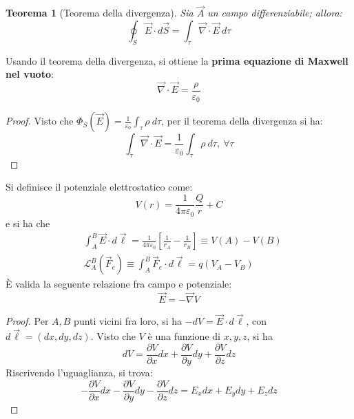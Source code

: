 \documentclass[10pt, a4paper]{scrartcl}
\numberwithin{equation}{subsection}
\theoremstyle{style1}
\newtheorem{teorema}{Teorema}[section]
\newenvironment{boxenv}[1][]{
    \begin{eqbox}[#1]
    }{
   \end{eqbox}
}
\begin{document}
\begin{teorema}
	[Teorema della divergenza]
	Sia $\vec{A}$ un campo differenziabile; allora:
	\begin{equation}
		\oint_{S} \vec{E}\cdot d\vec{S}= \int_{\tau } \vec{\nabla }\cdot \vec{E}\ d\tau 
	\end{equation}
\end{teorema}
\noindent Usando il teorema della divergenza, si ottiene la \textbf{prima equazione di Maxwell nel vuoto}:
\begin{equation}
	\vec{\nabla }\cdot \vec{E} = \frac{\rho }{\varepsilon _0}
\end{equation}
\begin{boxenv}[]
\begin{proof}
	Visto che $\Phi_S(\vec{E}) = \frac{1}{\varepsilon _0}\int_{\tau } \rho \ d\tau $, per il teorema della divergenza si ha:
	\[
	\int_{\tau } \vec{\nabla }\cdot \vec{E} = \frac{1}{\varepsilon _0} \int_{\tau } \rho  \ d\tau , \ \forall  \tau 
	\] 
\end{proof}
\end{boxenv}
\noindent Si definisce il potenziale elettrostatico come:
\begin{equation}
	V(r) = \frac{1}{4\pi \varepsilon _0} \frac{Q}{r} +C
\end{equation}
e si ha che
\begin{equation}
	\begin{split}
		&\int_{A} ^B \vec{E}\cdot d\vec{\ell } = \frac{1}{4 \pi \varepsilon _0} \left[ \frac{1}{r_A}-\frac{1}{r_B} \right] \equiv V(A) - V(B)\\
		& \mathcal{L}_A^B (\vec{F}_e) \equiv \int_{A} ^B \vec{F}_e\cdot d\vec{\ell } = q (V_A-V_B)
	\end{split}
\end{equation}
\`E valida la seguente relazione fra campo e potenziale:
\begin{equation}
	\vec{E} = - \vec{\nabla }V
\end{equation}
\begin{boxenv}[]
\begin{proof}
	Per $A,B$ punti vicini fra loro, si ha $-dV = \vec{E}\cdot d\vec{\ell }$, con $d\vec{\ell }= (dx,dy,dz)$. Visto che $V$ \`e una funzione di $x,y,z$, si ha 
	\[
	dV = \frac{\partial V}{\partial x} dx + \frac{\partial V}{\partial y} dy + \frac{\partial V}{\partial z} dz
	\] 
	Riscrivendo l'uguaglianza, si trova:
	\[
	-\frac{\partial V}{\partial x} dx - \frac{\partial V}{\partial y} dy - \frac{\partial V}{\partial z} dz = E_x dx + E_y dy + E_z dz 
	\] 
\end{proof}
\end{boxenv}
\end{document}
